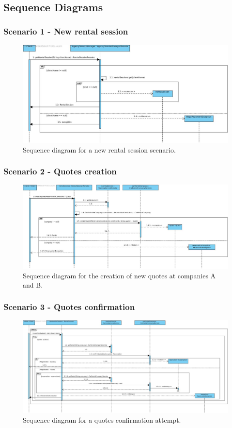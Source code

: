 \newpage
\subsection{Sequence Diagrams}
\subsubsection{Scenario 1 - New rental session}
\begin{figure}[h!]
	\centerline{\includegraphics[scale=0.4]{images/newSession}}
	\caption{Sequence diagram for a new rental session scenario.}
\end{figure}

\subsubsection{Scenario 2 - Quotes creation}
\begin{figure}[h!]
	\centerline{\includegraphics[scale=0.37]{images/quotes}}
	\caption{Sequence diagram for the creation of new quotes at companies A and B.}
\end{figure}

\newpage
\subsubsection{Scenario 3 - Quotes confirmation}
\begin{figure}[h!]
	\centerline{\includegraphics[scale=0.36]{images/confirmation}}
	\caption{Sequence diagram for a quotes confirmation attempt.}
\end{figure}